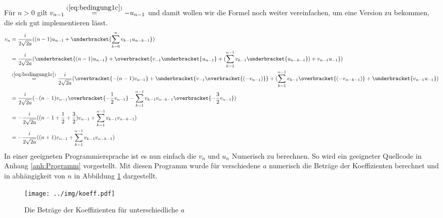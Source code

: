 Für $n>0$ gilt $v_{n-1}\overset{(\ref{eq:bedingung1c})}{=}-u_{n-1}$ und damit
wollen wir die Formel noch weiter vereinfachen, um eine Version zu bekommen,
die sich gut implementieren lässt.
\begin{align*}
v_{n} &= \frac{i}{2\sqrt{2a}}
  ((n-1)u_{n-1} + \underbracket{\sum_{k=0}^{n} v_{k-1}u_{n-k-1}})
\\&= \frac{i}{2\sqrt{2a}}
  (\underbracket{(n-1)u_{n-1}} + \overbracket{v_{-1}\underbracket{u_{n-1}}
  + (\sum_{k=1}^{n-1} v_{k-1}\underbracket{u_{n-k-1}}) + v_{n-1}u_{-1}})
\\&\overset{(\ref{eq:bedingung1c})}{=} \frac{i}{2\sqrt{2a}}
  (\overbracket{-(n-1)v_{n-1}} + \underbracket{v_{-1}\overbracket{(-v_{n-1})}}
  + (\sum_{k=1}^{n-1} v_{k-1}\overbracket{(-v_{n-k-1})}
  + \underbracket{v_{n-1}u_{-1}})
\\&= \frac{i}{2\sqrt{2a}} (-(n-1)v_{n-1} \overbracket{-\frac{1}{2}v_{n-1}}
  - \sum_{k=1}^{n-1} v_{k-1}v_{n-k-1} \overbracket{- \frac{3}{2} v_{n-1}})
\\&= - \frac{i}{2\sqrt{2a}} ((n-1+\frac{1}{2}+\frac{3}{2})v_{n-1}
  + \sum_{k=1}^{n-1} v_{k-1}v_{n-k-1})
\\&= - \frac{i}{2\sqrt{2a}} ((n+1)v_{n-1} + \sum_{k=1}^{n-1} v_{k-1}v_{n-k-1})
\end{align*}
In einer geeigneten Programmiersprache ist es nun einfach die $v_n$ und
$u_n$ Numerisch zu berechnen. So wird ein geeigneter Quellcode in Anhang
\ref{anh:Programm} vorgestellt. Mit diesen Programm wurde für verschiedene $a$
numerisch die Beträge der Koeffizienten berechnet und in abhängigkeit von $n$
in Abbildung \ref{fig:plotKoeffs} dargestellt.
\begin{figure}[htbp]
  \centering
  \texttt{[image: ../img/koeff.pdf]}
  \caption[Koeffizienten in abhängigkeit von $a$]
   {Die Beträge der Koeffizienten für unterschiedliche $a$}
  \label{fig:plotKoeffs}
\end{figure}

